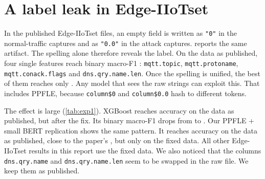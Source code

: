 \section{A label leak in Edge-IIoTset}\label{sec:leak}
In the published Edge-IIoTset files, an empty field is written as \texttt{"0"} in the normal-traffic captures and as
\texttt{"0.0"} in the attack captures. \citet{edgeleak2026} reports the same artifact. The spelling alone
therefore reveals the label. On the data as published, four single features reach binary macro-F1
: \texttt{mqtt.topic}, \texttt{mqtt.protoname},
\texttt{mqtt.conack.flags} and \texttt{dns.qry.name.len}. Once the spelling is unified, the best of them reaches only
. Any model that sees the raw strings can exploit this. That
includes PPFLE, because \texttt{column\$0} and \texttt{column\$0.0} hash to different tokens.

The effect is large (\cref{tab:exp1}). XGBoost reaches 
accuracy on the data as published, but  after the fix. Its
binary macro-F1 drops from  to
. Our PPFLE + small BERT replication shows the same pattern. It
reaches  accuracy on the data as published, close
to the paper's , but only  on
the fixed data. All other Edge-IIoTset results in this report use the fixed data. We also noticed that the columns
\texttt{dns.qry.name} and \texttt{dns.qry.name.len} seem to be swapped in the raw file. We keep them as published.
